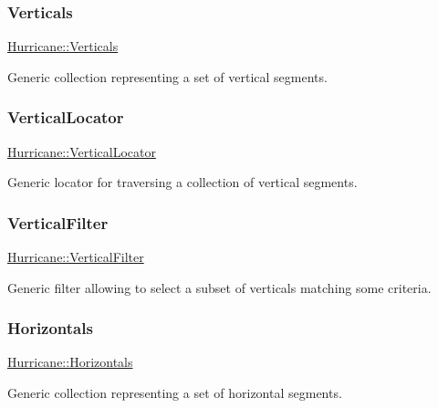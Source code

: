\subsubsection{\texorpdfstring{Verticals}{Verticals}}
{\footnotesize\ttfamily \mbox{\hyperlink{namespaceHurricane_a146e2d3d34b4035aff422f12e85345b9}{Hurricane\+::\+Verticals}}}

Generic collection representing a set of vertical segments. \mbox{\label{namespaceHurricane_a0b7ececb547a716d7d509210a271aae4}} 
\subsubsection{\texorpdfstring{Vertical\+Locator}{VerticalLocator}}
{\footnotesize\ttfamily \mbox{\hyperlink{namespaceHurricane_a0b7ececb547a716d7d509210a271aae4}{Hurricane\+::\+Vertical\+Locator}}}

Generic locator for traversing a collection of vertical segments. \mbox{\label{namespaceHurricane_a3ac8462f707e425944df83c57835b13d}} 
\subsubsection{\texorpdfstring{Vertical\+Filter}{VerticalFilter}}
{\footnotesize\ttfamily \mbox{\hyperlink{namespaceHurricane_a3ac8462f707e425944df83c57835b13d}{Hurricane\+::\+Vertical\+Filter}}}

Generic filter allowing to select a subset of verticals matching some criteria. \mbox{\label{namespaceHurricane_a721e644c7d97f2f66049ab062140b855}} 
\subsubsection{\texorpdfstring{Horizontals}{Horizontals}}
{\footnotesize\ttfamily \mbox{\hyperlink{namespaceHurricane_a721e644c7d97f2f66049ab062140b855}{Hurricane\+::\+Horizontals}}}

Generic collection representing a set of horizontal segments. \mbox{\label{namespaceHurricane_a7f4e07165be3dfcec8786e88370bdb67}} 
